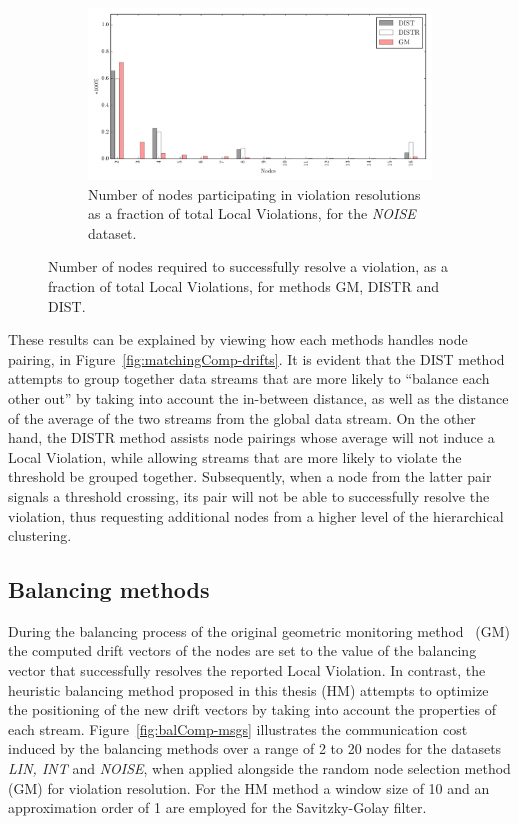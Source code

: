 \begin{figure}[H]
\begin{subfigure}{\textwidth}%
\centering
  \includegraphics[width=0.72\linewidth]{img/matchings_matchings_noisyinterweaving.pdf}
  \caption{Number of nodes participating in violation resolutions as a fraction of total Local Violations, for the \emph{NOISE} dataset.}
\end{subfigure}
\vspace{0.5cm}
\caption{Number of nodes required to successfully resolve a violation, as a fraction of total Local Violations, for methods GM, DISTR and DIST.} \label{fig:matchingComp-matchings}
\end{figure}

These results can be explained by viewing how each methods handles node pairing, in Figure~\ref{fig:matchingComp-drifts}. It is evident that the DIST method attempts to group together data streams that are more likely to ``balance each other out'' by taking into account the in-between distance, as well as the distance of the average of the two streams from the global data stream. On the other hand, the DISTR method assists node pairings whose average will not induce a Local Violation, while allowing streams that are more likely to violate the threshold be grouped together. Subsequently, when a node from the latter pair signals a threshold crossing, its pair will not be able to successfully resolve the violation, thus requesting additional nodes from a higher level of the hierarchical clustering.

\subsection{Balancing methods} \label{subsec:balComp}

During the balancing process of the original geometric monitoring method~\cite{Sharfman2006GM} (GM) the computed drift vectors of the nodes are set to the value of the balancing vector that successfully resolves the reported Local Violation. In contrast, the heuristic balancing method proposed in this thesis (HM) attempts to optimize the positioning of the new drift vectors by taking into account the properties of each stream. Figure~\ref{fig:balComp-msgs} illustrates the communication cost induced by the balancing methods over a range of 2 to 20 nodes for the datasets \emph{LIN, INT} and \emph{NOISE}, when applied alongside the random node selection method (GM) for violation resolution. For the HM method a window size of 10 and an approximation order of 1 are employed for the Savitzky-Golay filter.


